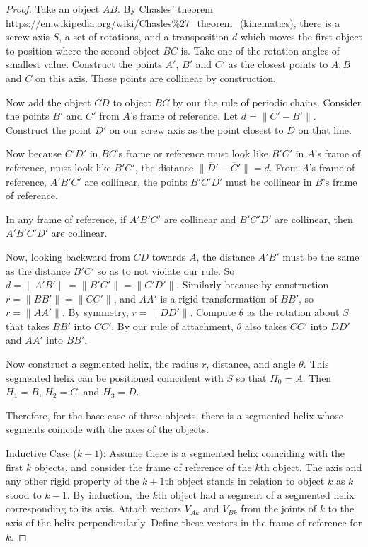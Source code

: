\documentclass[11pt]{article}
\begin{document}
{\begin{proof}
  Take an object $AB$. By Chasles' theorem  \url{https://en.wikipedia.org/wiki/Chasles%27_theorem_(kinematics)},
    there is a screw axis $S$, a set of rotations,  and a transposition $d$ which moves the first object to
    position where the second object $BC$ is. Take one of the rotation angles of smallest value.
    Construct the points $A'$, $B'$ and $C'$ as the closest points
  to $A,B$ and $C$ on this axis. These points are collinear by construction.

  Now add the object $CD$ to object $BC$ by our the rule of periodic chains. Consider the points
  $B'$ and $C'$ from $A$'s frame of reference. Let $d = \| \overline C' - \overline B' \|$.
  Construct the point $D'$ on our screw axis as the point closest to $D$ on that line.

  Now because $C'D'$ in $BC$'s frame or reference must look like $B'C'$ in $A$'s frame of reference,
  must look like $B'C'$, the distance $\| \overline D' - \overline C' \| = d$.
  From $A$'s frame of reference, $A'B'C'$ are collinear, the points $B'C'D'$ must be collinear in
  $B$'s frame of reference.

  In any frame of reference, if $A'B'C'$ are collinear and $B'C'D'$ are collinear, then $A'B'C'D'$
  are collinear.

  Now, looking backward from $CD$ towards $A$, the distance $A'B'$ must be the same as the
  distance $B'C'$ so as to not violate our rule. So $d = \| A'B' \| = \| B'C' \| = \| C'D'\|$.
  Similarly because by construction $r = \| B B' \| = \| C C' \|$, and $AA'$ is a rigid
  transformation of $BB'$, so $r = \| A A' \|$. By symmetry, $r = \| D D' \|$.
  Compute $\theta$ as the rotation about $S$ that takes $B B'$ into $C C'$. By our rule
  of attachment, $\theta$ also takes $C C'$ into $D D'$ and $A A'$ into $B B'$.

  Now construct a segmented helix, the radius $r$, distance,
  and angle $\theta$. This segmented helix can be positioned coincident with $S$ so
  that $H_0 = A$. Then $H_1=B$, $H_2=C$, and $H_3=D$.

  Therefore, for the base case of three objects, there is a segmented helix whose
  segments coincide with the axes of the objects.


  Inductive Case ($k+1$):
  Assume there is a segmented helix coinciding with the first $k$ objects, and
  consider the frame of reference of the $k$th object. The axis and any
  other rigid property of the $k+1$th object stands in relation to object $k$
  as $k$ stood to $k-1$. By induction, the $k$th object had a segment
  of a segmented helix corresponding to its axis. Attach vectors $V_{Ak}$ and $V_{Bk}$
  from the
  joints of $k$ to the axis of the helix perpendicularly. Define these
  vectors in the frame of reference for $k$.


\end{proof}}
\end{document}
